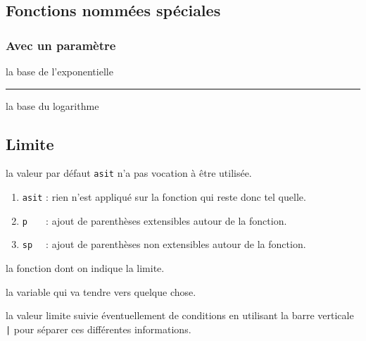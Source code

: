 \documentclass[12pt,a4paper]{book}
\theoremstyle{definition}
\newcommand\separation{
	\medskip
	\hfill\rule{0.5\textwidth}{0.75pt}\hfill
	\medskip
}
\begin{document}
{{{    \IDope{\k} 
}





\subsection{Fonctions nommées spéciales}

\subsubsection{Avec un paramètre}





\IDoption{} la base de l'exponentielle

\separation


\IDoption{} la base du logarithme





\subsection{Limite}





\IDoption{}  la valeur par défaut \verb+asit+ n'a pas vocation à être utilisée. 
\begin{enumerate}
	\item \verb+asit+ : rien n'est appliqué sur la fonction qui reste donc tel quelle.
	
	\item \verb+p   + : ajout de parenthèses extensibles autour de la fonction.

	\item \verb+sp  + : ajout de parenthèses non extensibles autour de la fonction.
\end{enumerate}


 la fonction dont on indique la limite.

 la variable qui va tendre vers quelque chose.

 la valeur limite suivie éventuellement de conditions en utilisant la barre verticale \verb+|+ pour séparer ces différentes informations.


}}
\end{document}
